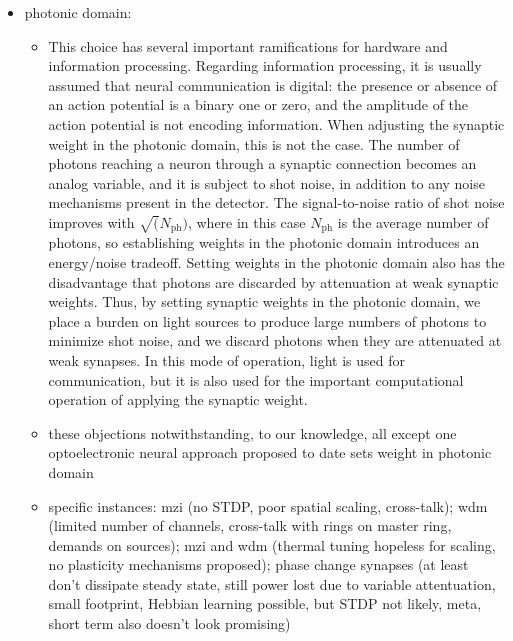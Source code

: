 \documentclass[twocolumn]{article}
\begin{document}
\begin{itemize}
\item photonic domain:
\begin{itemize}
\item This choice has several important ramifications for hardware and information processing. Regarding information processing, it is usually assumed that neural communication is digital: the presence or absence of an action potential is a binary one or zero, and the amplitude of the action potential is not encoding information. When adjusting the synaptic weight in the photonic domain, this is not the case. The number of photons reaching a neuron through a synaptic connection becomes an analog variable, and it is subject to shot noise, in addition to any noise mechanisms present in the detector. The signal-to-noise ratio of shot noise improves with $\sqrt(N_{\mathrm{ph}})$, where in this case $N_{\mathrm{ph}}$ is the average number of photons, so establishing weights in the photonic domain introduces an energy/noise tradeoff. Setting weights in the photonic domain also has the disadvantage that photons are discarded by attenuation at weak synaptic weights. Thus, by setting synaptic weights in the photonic domain, we place a burden on light sources to produce large numbers of photons to minimize shot noise, and we discard photons when they are attenuated at weak synapses. In this mode of operation, light is used for communication, but it is also used for the important computational operation of applying the synaptic weight.
\item these objections notwithstanding, to our knowledge, all except one optoelectronic neural approach proposed to date sets weight in photonic domain
\item specific instances: mzi (no STDP, poor spatial scaling, cross-talk); wdm (limited number of channels, cross-talk with rings on master ring, demands on sources); mzi and wdm (thermal tuning hopeless for scaling, no plasticity mechanisms proposed); phase change synapses (at least don't dissipate steady state, still power lost due to variable attentuation, small footprint, Hebbian learning possible, but STDP not likely, meta, short term also doesn't look promising)
\end{itemize}


\end{itemize}
\end{document}
